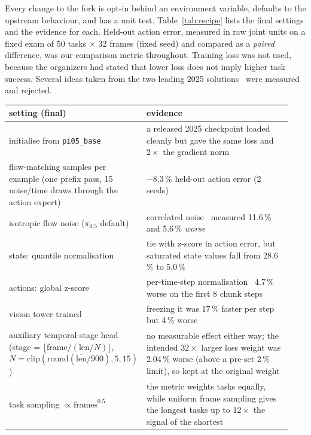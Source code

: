 \documentclass[10pt]{article}
\newcommand{\pizf}{$\pi_{0.5}$}
\begin{document}
Every change to the fork is opt-in behind an environment variable, defaults to the upstream behaviour, and has a unit
test. Table~\ref{tab:recipe} lists the final settings and the evidence for each. Held-out action error, measured in
raw joint units on a fixed exam of 50 tasks $\times$ 32 frames (fixed seed) and compared as a \emph{paired}
difference, was our comparison metric throughout. Training loss was not used, because the organizers had stated that
lower loss does not imply higher task success. Several ideas taken from the two leading 2025 solutions~\cite{rlc2025,comet2025}
were measured and rejected.

\begin{table}[t]
\centering\small
\renewcommand{\arraystretch}{1.15}
\begin{tabular}{@{}>{\raggedright\arraybackslash}p{0.34\linewidth}>{\raggedright\arraybackslash}p{0.6\linewidth}@{}}
\toprule
\textbf{setting (final)} & \textbf{evidence} \\
\midrule
initialise from \texttt{pi05\_base} & a released 2025 checkpoint loaded cleanly but gave the same loss and $2\times$ the gradient norm \\
\arrayrulecolor{black!25}\midrule
15 flow-matching samples per example (one prefix pass, 15 noise/time draws through the action expert) & $-8.3$\,\% held-out action error (2 seeds) \\
\arrayrulecolor{black!25}\midrule
isotropic flow noise (\pizf{} default) & correlated noise~\cite{rlc2025} measured 11.6\,\% and 5.6\,\% \emph{worse} \\
\arrayrulecolor{black!25}\midrule
state: quantile normalisation & tie with z-score in action error, but saturated state values fall from 28.6\,\% to 5.0\,\% \\
\arrayrulecolor{black!25}\midrule
actions: global z-score & per-time-step normalisation~\cite{rlc2025} 4.7\,\% worse on the first 8 chunk steps \\
\arrayrulecolor{black!25}\midrule
vision tower trained & freezing it was 17\,\% faster per step but 4\,\% worse \\
\arrayrulecolor{black!25}\midrule
auxiliary temporal-stage head (stage = $\lfloor$frame$/(\text{len}/N)\rfloor$, $N=\mathrm{clip}(\mathrm{round}(\overline{\text{len}}/900),5,15)$) & no measurable effect either way; the intended $32\times$ larger loss weight was 2.04\,\% worse (above a pre-set 2\,\% limit), so kept at the original weight \\
\arrayrulecolor{black!25}\midrule
task sampling $\propto \text{frames}^{0.5}$ & the metric weights tasks equally, while uniform frame sampling gives the longest tasks up to $12\times$ the signal of the shortest \\

\end{tabular}
\end{table}
\end{document}
